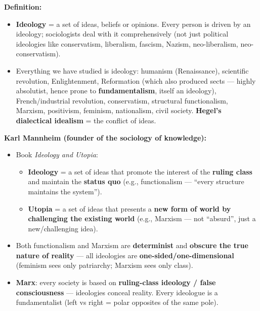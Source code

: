 \begin{KeyConcept}
\textbf{Definition:}
\begin{itemize}
\item \textbf{Ideology} = a set of ideas, beliefs or opinions. Every person is driven by an ideology; sociologists deal with it comprehensively (not just political ideologies like conservatism, liberalism, fascism, Nazism, neo-liberalism, neo-conservatism).
\item Everything we have studied is ideology: humanism (Renaissance), scientific revolution, Enlightenment, Reformation (which also produced sects --- highly absolutist, hence prone to \textbf{fundamentalism}, itself an ideology), French/industrial revolution, conservatism, structural functionalism, Marxism, positivism, feminism, nationalism, civil society. \textbf{Hegel's dialectical idealism} = the conflict of ideas.
\end{itemize}
\end{KeyConcept}

\begin{DataFact}
\textbf{Karl Mannheim (founder of the sociology of knowledge):}
\begin{itemize}
\item Book \textit{Ideology and Utopia}:
\begin{itemize}
\item \textbf{Ideology} = a set of ideas that promote the interest of the \textbf{ruling class} and maintain the \textbf{status quo} (e.g., functionalism --- ``every structure maintains the system'').
\item \textbf{Utopia} = a set of ideas that presents a \textbf{new form of world by challenging the existing world} (e.g., Marxism --- not ``absurd'', just a new/challenging idea).
\end{itemize}
\item Both functionalism and Marxism are \textbf{determinist} and \textbf{obscure the true nature of reality} --- all ideologies are \textbf{one-sided/one-dimensional} (feminism sees only patriarchy; Marxism sees only class).
\item \textbf{Marx}: every society is based on \textbf{ruling-class ideology / false consciousness} --- ideologies conceal reality. Every ideologue is a fundamentalist (left vs right = polar opposites of the same pole).
\end{itemize}
\end{DataFact}

